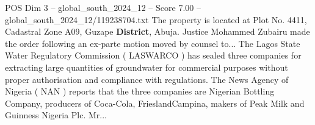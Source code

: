 \begin{textsample}{POS Dim 3 – global\_south\_2024\_12 – Score 7.00 – global\_south\_2024\_12/119238704.txt}
The property is located at Plot No. 4411, Cadastral Zone A09, Guzape \textbf{District}, Abuja.
Justice Mohammed Zubairu made the order following an ex-parte motion moved by counsel to...
The Lagos State Water Regulatory Commission ( LASWARCO ) has sealed three companies for extracting large quantities of groundwater for commercial purposes without proper authorisation and compliance with regulations.
The News Agency of Nigeria ( NAN ) reports that the three companies are Nigerian Bottling Company, producers of Coca-Cola, FrieslandCampina, makers of Peak Milk and Guinness Nigeria Plc.
Mr...

\end{textsample}
